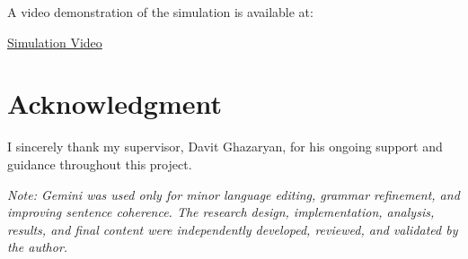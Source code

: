 \documentclass[conference]{IEEEtran}
\begin{document}
A video demonstration of the simulation is available at:

\href{https://drive.google.com/file/d/1KRslnW8ghdw45RbBAjVVYINz5Oh-5XL_/view?usp=sharing}{Simulation Video}

\section*{Acknowledgment}
I sincerely thank my supervisor, Davit Ghazaryan, for his ongoing support and guidance throughout this project.
\vspace{1em}

\textit{Note: Gemini was used only for minor language editing, grammar refinement, and improving sentence coherence. The research design, implementation, analysis, results, and final content were independently developed, reviewed, and validated by the author.}



\end{document}

